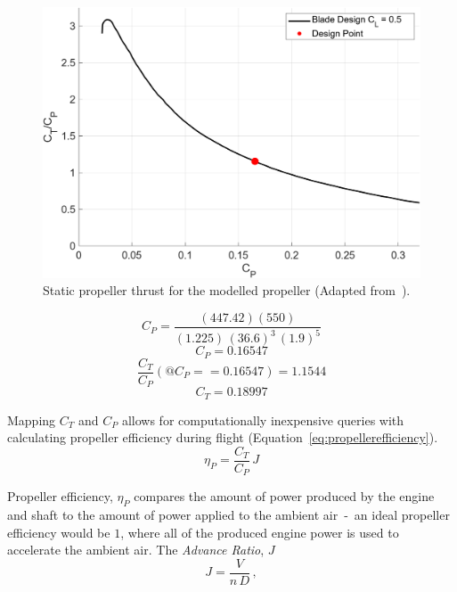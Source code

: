 \begin{figure}[!ht]\label{fig:staticpropthrust}
    \centering
    \includegraphics[width=0.85\linewidth]{Figures/StaticThrust.png}
    \caption{Static propeller thrust for the modelled propeller (Adapted from~\cite{GeneralizedMethodPropeller1963}).}
\end{figure}

\begin{equation}\label{eq:calcCT1}
    C_P = \frac{(447.42)(550)}{{(1.225)} \, {(36.6)}^3 \, {(1.9)}^5}
\end{equation}
\begin{equation}\label{eq:calcCT2}
    C_P = 0.16547
\end{equation}
\begin{equation}\label{eq:calcCT3}
    \frac{C_T}{C_P}(@C_P == 0.16547) = 1.1544
\end{equation}
\begin{equation}\label{eq:calcCT4}
    C_T = 0.18997
\end{equation}


Mapping \(C_T\) and \(C_P\) allows for computationally inexpensive queries with calculating propeller efficiency during flight (Equation~\ref{eq:propellerefficiency}).
\begin{equation}\label{eq:propellerefficiency}
    \eta_P = \frac{C_T}{C_P} \, J
\end{equation}

Propeller efficiency, \( \eta_P \) compares the amount of power produced by the engine and shaft to the amount of power applied to the ambient air~-~an ideal propeller efficiency would be \(1\), where all of the produced engine power is used to accelerate the ambient air. The \textit{Advance Ratio}, \(J\)
\begin{equation}\label{eq:advanceRatio}
    J = \frac{V}{n \, D} \, ,
\end{equation}

